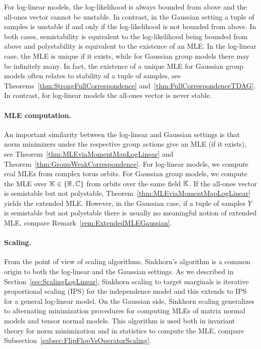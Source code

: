 For log-linear models, the log-likelihood is always bounded from above and the all-ones vector cannot be unstable. In contrast, in the Gaussian setting a tuple of samples is unstable if and only if the log-likelihood is not bounded from above. 
In both cases, semistability is equivalent to the log-likelihood being bounded from above and polystability is equivalent to the existence of an MLE. In the log-linear case, the MLE is unique if it exists, while for Gaussian group models there may be infinitely many.
In fact, the existence of a unique MLE for Gaussian group models often relates to stability of a tuple of samples, see Theorems~\ref{thm:StrongFullCorrespondence} and~\ref{thm:FullCorrespondenceTDAG}.
In contrast, for log-linear models the all-ones vector is never stable.

\paragraph{MLE computation.}
An important similarity between the log-linear and Gaussian settings is that norm minimizers under the respective group actions give an MLE (if it exists), see Theorem~\ref{thm:MLEviaMomentMapLogLinear} and Theorem~\ref{thm:GroupWeakCorrespondence}.
For log-linear models, we compute real MLEs from complex torus orbits.
For Gaussian group models, we  compute the MLE over $\mathbb K \in \{ \mathbb R, \mathbb C \}$ from orbits over the same field $\mathbb K$.
If the all-ones vector is semistable but not polystable, 
Theorem~\ref{thm:MLEviaMomentMapLogLinear} yields the extended MLE.
However, in the Gaussian case, if a tuple of samples $Y$ is semistable but not polystable there is usually no meaningful notion of extended MLE, compare Remark~\ref{rem:ExtendedMLEGaussian}.


\paragraph{Scaling.}
From the point of view of scaling algorithms, Sinkhorn's algorithm is  a common origin to both the log-linear and the Gaussian settings. As we described in Section~\ref{sec:ScalingLogLinear}, Sinkhorn scaling to target marginals is iterative proportional scaling (IPS) for the independence model and this extends to IPS for a general log-linear model. On the Gaussian side, Sinkhorn scaling generalizes to alternating minimization procedures for computing MLEs of matrix normal models and tensor normal models.
This algorithm is used both in invariant theory for norm minimization and in statistics to compute the MLE, compare Subsection~\ref{subsec:FlipFlopVsOperatorScaling}.

